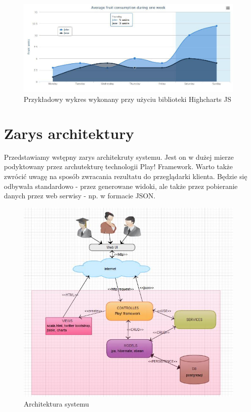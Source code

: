\documentclass[a4paper,12pt,notitlepage]{mwrep}
\begin{document}
\begin{figure}[H]
\centering
\includegraphics[scale=0.5]{images/highCharts.png}
\caption{Przykładowy wykres wykonany przy użyciu biblioteki Highcharts JS}
\label{fig:highCharts}
\end{figure}



\section{Zarys architektury}
Przedstawiamy wstępny zarys architekruty systemu. Jest on w dużej mierze podyktowany przez archutekturę technologii Play! Framework. 
Warto także zwrócić uwagę na sposób zwracania rezultatu do przeglądarki klienta. Będzie się odbywała standardowo - przez generowane 
widoki, ale także przez pobieranie danych przez web serwisy - np. w formacie JSON.

\begin{figure}[H]
\centering
\includegraphics[scale=0.5]{images/tasksArch.jpg}
\caption{Architektura systemu}
\label{fig:tasksArch}
\end{figure}
\end{document}
